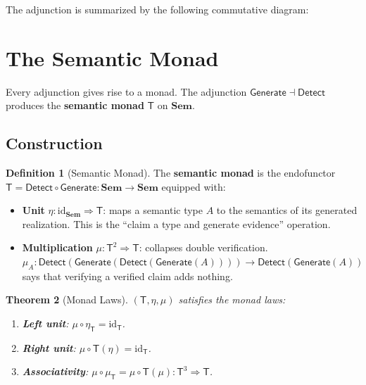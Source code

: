 \documentclass[11pt,a4paper]{article}
\theoremstyle{plain}
\newtheorem{theorem}{Theorem}[section]
\theoremstyle{definition}
\newtheorem{definition}[theorem]{Definition}
\theoremstyle{remark}
\newcommand{\Sem}{\mathbf{Sem}}
\newcommand{\id}{\mathrm{id}}
\newcommand{\Detect}{\mathsf{Detect}}
\newcommand{\Generate}{\mathsf{Generate}}
\newcommand{\SemanticT}{\mathsf{T}}
\begin{document}
The adjunction is summarized by the following commutative diagram:

\begin{center}
\end{center}


\section{The Semantic Monad}\label{sec:monad}

Every adjunction gives rise to a monad. The adjunction $\Generate \dashv \Detect$ produces the \textbf{semantic monad} $\SemanticT$ on $\Sem$.

\subsection{Construction}

\begin{definition}[Semantic Monad]\label{def:semantic-monad}
The \textbf{semantic monad} is the endofunctor $\SemanticT = \Detect \circ \Generate\colon \Sem \to \Sem$ equipped with:
\begin{itemize}[nosep]
  \item \textbf{Unit} $\eta\colon \id_{\Sem} \Rightarrow \SemanticT$: maps a semantic type $A$ to the semantics of its generated realization. This is the ``claim a type and generate evidence'' operation.
  \item \textbf{Multiplication} $\mu\colon \SemanticT^2 \Rightarrow \SemanticT$: collapses double verification. $\mu_A\colon \Detect(\Generate(\Detect(\Generate(A)))) \to \Detect(\Generate(A))$ says that verifying a verified claim adds nothing.
\end{itemize}
\end{definition}

\begin{theorem}[Monad Laws]\label{thm:monad-laws}
$(\SemanticT, \eta, \mu)$ satisfies the monad laws:
\begin{enumerate}[nosep]
  \item \textbf{Left unit}: $\mu \circ \eta_{\SemanticT} = \id_{\SemanticT}$.
  \item \textbf{Right unit}: $\mu \circ \SemanticT(\eta) = \id_{\SemanticT}$.
  \item \textbf{Associativity}: $\mu \circ \mu_{\SemanticT} = \mu \circ \SemanticT(\mu)\colon \SemanticT^3 \Rightarrow \SemanticT$.
\end{enumerate}
\end{theorem}
\end{document}
